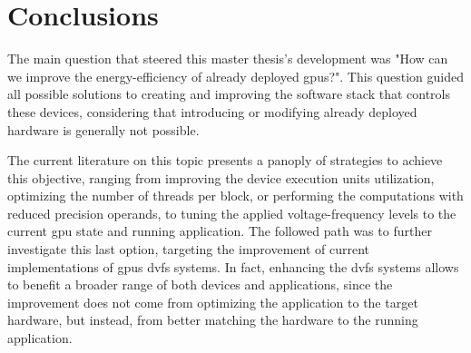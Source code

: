 
\chapter{Conclusions}
\label{chapter:conclusions}

The main question that steered this master thesis's development was "How can we improve the energy-efficiency of already deployed \acrshort{gpu}s?". This question guided all possible solutions to creating and improving the software stack that controls these devices, considering that introducing or modifying already deployed hardware is generally not possible.

The current literature on this topic presents a panoply of strategies to achieve this objective, ranging from improving the device execution units utilization, optimizing the number of threads per block, or performing the computations with reduced precision operands, to tuning the applied voltage-frequency levels to the current \acrshort{gpu} state and running application. The followed path was to further investigate this last option, targeting the improvement of current implementations of \acrshort{gpu}s \acrshort{dvfs} systems. In fact, enhancing the \acrshort{dvfs} systems allows to benefit a broader range of both devices and applications, since the improvement does not come from optimizing the application to the target hardware, but instead, from better matching the hardware to the running application.

